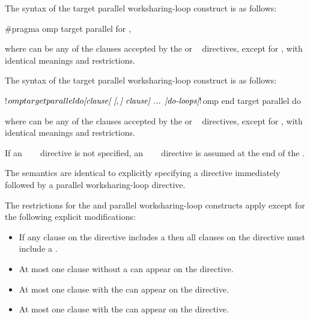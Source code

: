 \syntax
\begin{ccppspecific}
The syntax of the target parallel worksharing-loop construct is as follows:

\begin{ompcPragma}
#pragma omp target parallel for \plc{[clause[ [},\plc{] clause] ... ] new-line}
\end{ompcPragma}

where  can be any of the clauses accepted by the  or
~ directives, except for , with identical 
meanings and restrictions.
\end{ccppspecific}

\begin{fortranspecific}
The syntax of the target parallel worksharing-loop construct is as follows:

\begin{ompfPragma}
!$omp target parallel do \plc{[clause[ [},\plc{] clause] ... ]}
    \plc{do-loops}
\plc{[}!$omp end target parallel do\plc{]}
\end{ompfPragma}

where  can be any of the clauses accepted by the  or
~ directives, except for , with identical 
meanings and restrictions.

If an ~~~ directive is not 
specified, an ~~~ directive 
is assumed at the end of the .
\end{fortranspecific}

\descr
The semantics are identical to explicitly specifying a  directive
immediately followed by a parallel worksharing-loop directive.


\restrictions
The restrictions for the  and parallel worksharing-loop constructs 
apply except for the following explicit modifications:

\begin{itemize}
\item If any  clause on the directive includes a
       then all  clauses
      on the directive must include a .
\item At most one  clause without a
       can appear on the directive.
\item At most one  clause with the 
       can appear on the directive.
\item At most one  clause with the 
       can appear on the directive.
\end{itemize}

